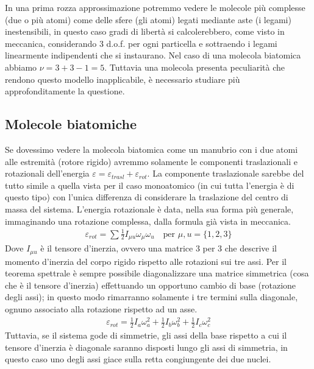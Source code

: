 \documentclass[
10pt, %
a4paper, %
oneside, %
headinclude,footinclude, %
BCOR5mm, %
]{scrartcl}
\begin{document}
In una prima rozza approssimazione potremmo vedere le molecole più complesse (due o più atomi) come delle sfere (gli atomi) legati mediante aste (i legami) inestensibili, in questo caso gradi di libertà si calcolerebbero, come visto in meccanica, considerando 3 d.o.f. per ogni particella e sottraendo i legami linearmente indipendenti che si instaurano. Nel caso di una molecola biatomica abbiamo $\nu = 3+3-1 = 5$. Tuttavia una molecola presenta peculiarità che rendono questo modello inapplicabile, è necessario studiare più approfonditamente la questione. 
\subsection{Molecole biatomiche}
Se dovessimo vedere la molecola biatomica come un manubrio con i due atomi alle estremità (rotore rigido) avremmo solamente le componenti traslazionali e rotazionali dell'energia \(\varepsilon = \varepsilon_{trasl}+\varepsilon_{rot}\). La componente traslazionale sarebbe del tutto simile a quella vista per il caso monoatomico (in cui tutta l'energia è di questo tipo) con l'unica differenza di considerare la traslazione del centro di massa del sistema. L'energia rotazionale è data, nella sua forma più generale, immaginando una rotazione complessa, dalla formula già vista in meccanica.
\begin{align*} 
	\varepsilon_{rot} = \sum\frac{1}{2} I_{\mu u}\omega_{\mu}\omega_u \quad \text{per } \mu, u = \{1,2,3\}
\end{align*} 
Dove \(I_{\mu u}\) è il tensore d'inerzia, ovvero una matrice 3 per 3 che descrive il momento d'inerzia del corpo rigido rispetto alle rotazioni sui tre assi. Per il teorema spettrale è sempre possibile diagonalizzare una matrice simmetrica (cosa che è il tensore d'inerzia)  effettuando un opportuno cambio di base (rotazione degli assi); in questo modo rimarranno solamente i tre termini sulla diagonale, ognuno associato alla rotazione rispetto ad un asse. 
\begin{align*} 
	\varepsilon_{rot} = \frac{1}{2 }I_a \omega_a^2 + \frac{1}{2 } I_b \omega_b^2 + \frac{1}{2 } I_c \omega_c^2
\end{align*}  
Tuttavia, se il sistema gode di simmetrie, gli assi della base rispetto a cui il tensore d'inerzia è diagonale saranno disposti lungo gli assi di simmetria, in questo caso uno degli assi giace sulla retta congiungente dei due nuclei. 
\end{document}

